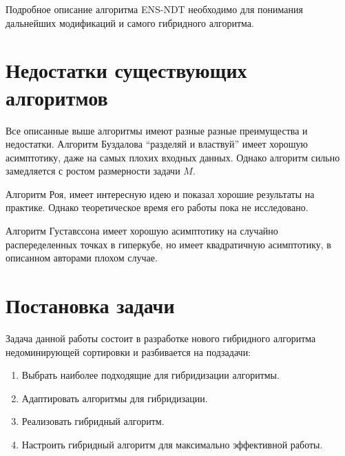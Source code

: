 Подробное описание алгоритма ENS-NDT необходимо для понимания дальнейших модификаций и самого гибридного алгоритма.

\section{Недостатки существующих алгоритмов}

Все описанные выше алгоритмы имеют разные разные преимущества и недостатки. Алгоритм Буздалова ``разделяй и властвуй'' имеет хорошую асимптотику, даже на самых плохих входных данных. Однако алгоритм сильно замедляется с ростом размерности задачи $M$. 

Алгоритм Роя, имеет интересную идею и показал хорошие результаты на практике. Однако теоретическое время его работы пока не исследовано. 

Алгоритм Густавссона имеет хорошую асимптотику на случайно распеределенных точках в гиперкубе, но имеет квадратичную асимптотику, в описанном авторами плохом случае. 

\section{Постановка задачи}

Задача данной работы состоит в разработке нового гибридного алгоритма недоминирующей сортировки и разбивается на подзадачи:
\begin{enumerate}
	\item Выбрать наиболее подходящие для гибридизации алгоритмы.
	\item Адаптировать алгоритмы для гибридизации.
	\item Реализовать гибридный алгоритм.
	\item Настроить гибридный алгоритм для максимально эффективной работы.
\end{enumerate}
